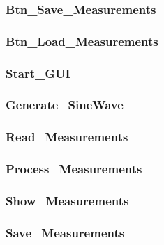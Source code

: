 \subsubsection{Btn\_Save\_Measurements}



\subsubsection{Btn\_Load\_Measurements}




\subsubsection{Start\_GUI} 




\subsubsection{Generate\_SineWave} 





\subsubsection{Read\_Measurements}


\subsubsection{Process\_Measurements} 





\subsubsection{Show\_Measurements} 


\subsubsection{Save\_Measurements} 


